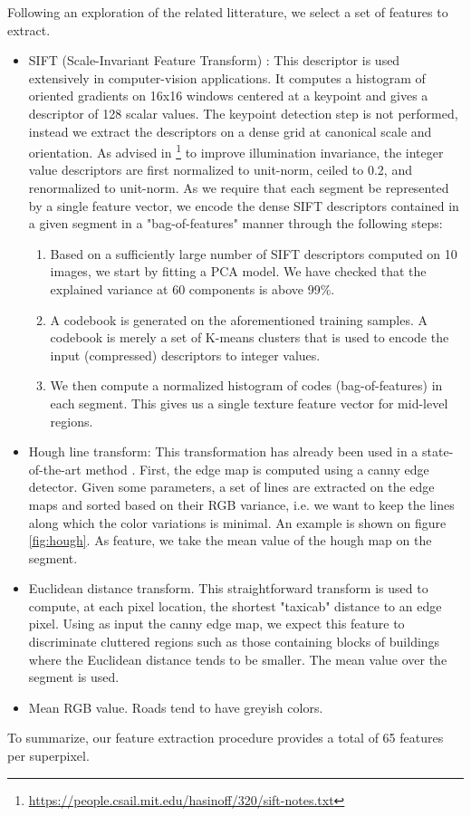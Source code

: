 \documentclass[10pt,conference,compsocconf]{IEEEtran}
\begin{document}
Following an exploration of the related litterature, we select a set of features to extract.
\begin{itemize}
\item SIFT (Scale-Invariant Feature Transform) \cite{lowe04}: This descriptor is used extensively in computer-vision applications. It computes a histogram of oriented gradients on 16x16 windows centered at a keypoint and gives a descriptor of 128 scalar values. The keypoint detection step is not performed, instead we extract the descriptors on a dense grid at canonical scale and orientation. As advised in \footnote{\url{https://people.csail.mit.edu/hasinoff/320/sift-notes.txt}}
 to improve illumination invariance, the integer value descriptors are first normalized to unit-norm, ceiled to 0.2, and renormalized to unit-norm. As we require that each segment be represented by a single feature vector, we encode the dense SIFT descriptors contained in a given segment in a "bag-of-features" manner through the following steps: 
\begin{enumerate}
\item Based on a sufficiently large number of SIFT descriptors computed on 10 images, we start by fitting a PCA model. We have checked that the explained variance at 60 components is above 99\%.
\item A codebook is generated on the aforementioned training samples. A codebook is merely a set of K-means clusters that is used to encode the input (compressed) descriptors to integer values.
\item We then compute a normalized histogram of codes (bag-of-features) in each segment. This gives us a single texture feature vector for mid-level regions.
\end{enumerate}
\item Hough line transform: This transformation has already been used in a state-of-the-art method \cite{2016ISPAr41B3..891L}. First, the edge map is computed using a canny edge detector. Given some parameters, a set of lines are extracted on the edge maps and sorted based on their RGB variance, i.e. we want to keep the lines along which the color variations is minimal. An example is shown on figure \ref{fig:hough}. As feature, we take the mean value of the hough map on the segment.
\item Euclidean distance transform. This straightforward transform is used to compute, at each pixel location, the shortest "taxicab" distance to an edge pixel. Using as input the canny edge map, we expect this feature to discriminate cluttered regions such as those containing blocks of buildings where the Euclidean distance tends to be smaller. The mean value over the segment is used.
\item Mean RGB value. Roads tend to have greyish colors.
\end{itemize}
To summarize, our feature extraction procedure provides a total of 65 features per superpixel.
\end{document}
